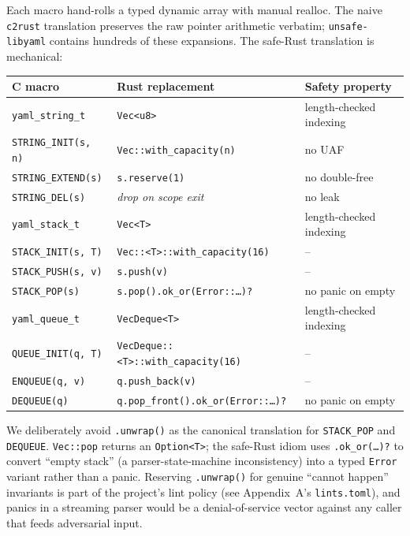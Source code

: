 \documentclass[12pt]{article}
\theoremstyle{definition}
\theoremstyle{remark}
\begin{document}
Each macro hand-rolls a typed dynamic array with manual realloc. The naive
\texttt{c2rust} translation preserves the raw pointer arithmetic verbatim;
\texttt{unsafe-libyaml} contains hundreds of these expansions. The safe-Rust
translation is mechanical:

\begin{center}
\begin{tabular}{l|l|l}
\textbf{C macro} & \textbf{Rust replacement} & \textbf{Safety property} \\\hline
\texttt{yaml\_string\_t} & \texttt{Vec<u8>} & length-checked indexing\\
\texttt{STRING\_INIT(s, n)} & \texttt{Vec::with\_capacity(n)} & no UAF\\
\texttt{STRING\_EXTEND(s)} & \texttt{s.reserve(1)} & no double-free\\
\texttt{STRING\_DEL(s)} & \emph{drop on scope exit} & no leak\\
\texttt{yaml\_stack\_t} & \texttt{Vec<T>} & length-checked indexing\\
\texttt{STACK\_INIT(s, T)} & \texttt{Vec::<T>::with\_capacity(16)} & --\\
\texttt{STACK\_PUSH(s, v)} & \texttt{s.push(v)} & --\\
\texttt{STACK\_POP(s)} & \texttt{s.pop().ok\_or(Error::\dots)?} & no panic on empty\\
\texttt{yaml\_queue\_t} & \texttt{VecDeque<T>} & length-checked indexing\\
\texttt{QUEUE\_INIT(q, T)} & \texttt{VecDeque::<T>::with\_capacity(16)} & --\\
\texttt{ENQUEUE(q, v)} & \texttt{q.push\_back(v)} & --\\
\texttt{DEQUEUE(q)} & \texttt{q.pop\_front().ok\_or(Error::\dots)?} & no panic on empty\\
\end{tabular}
\end{center}

\noindent We deliberately avoid \texttt{.unwrap()} as the canonical translation
for \texttt{STACK\_POP} and \texttt{DEQUEUE}. \texttt{Vec::pop} returns an
\texttt{Option<T>}; the safe-Rust idiom uses \texttt{.ok\_or(\dots)?} to
convert ``empty stack'' (a parser-state-machine inconsistency) into a typed
\texttt{Error} variant rather than a panic. Reserving \texttt{.unwrap()} for
genuine ``cannot happen'' invariants is part of the project's lint policy
(see Appendix~A's \texttt{lints.toml}), and panics in a streaming parser
would be a denial-of-service vector against any caller that feeds adversarial
input.
\end{document}
